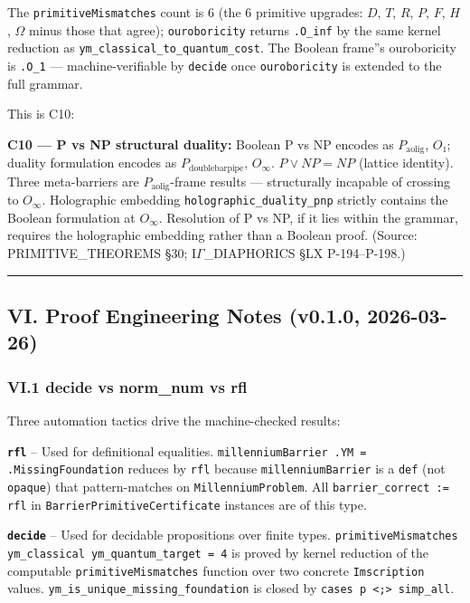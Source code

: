 \documentclass[12pt,a4paper]{article}
\newcommand{\pilcrow}{\S}
\begin{document}
The \texttt{primitiveMismatches} count is 6 (the 6 primitive upgrades: $D$, $T$, $R$, $P$, $F$, $H$, $\Omega$ minus those that agree); \texttt{ouroboricity} returns \texttt{.O\_inf} by the same kernel reduction as \texttt{ym\_classical\_to\_quantum\_cost}. The Boolean frame''s ouroboricity is \texttt{.O\_1} --- machine-verifiable by \texttt{decide} once \texttt{ouroboricity} is extended to the full grammar.

This is C10:

\textbf{C10 --- P vs NP structural duality:} Boolean P vs NP encodes as $P_{\text{aolig}}$, $O₁$; duality formulation encodes as $P_{\text{doublebarpipe}}$, $O_{\infty}$. $P \vee NP = NP$ (lattice identity). Three meta-barriers are $P_{\text{aolig}}$-frame results --- structurally incapable of crossing to $O_{\infty}$. Holographic embedding \texttt{holographic\_duality\_pnp} strictly contains the Boolean formulation at $O_{\infty}$. Resolution of P vs NP, if it lies within the grammar, requires the holographic embedding rather than a Boolean proof. (Source: PRIMITIVE\_THEOREMS \pilcrow{}30; I$\Gamma$\_DIAPHORICS \pilcrow{}LX P-194--P-198.)

\begin{center}
\rule{0.5\textwidth}{0.4pt}
\end{center}

\subsection{VI. Proof Engineering Notes (v0.1.0, 2026-03-26)}

\subsubsection{VI.1 decide vs norm\_num vs rfl}

Three automation tactics drive the machine-checked results:

\textbf{\texttt{rfl}}  --  Used for definitional equalities. \texttt{millenniumBarrier .YM = .MissingFoundation} reduces by \texttt{rfl} because \texttt{millenniumBarrier} is a \texttt{def} (not \texttt{opaque}) that pattern-matches on \texttt{MillenniumProblem}. All \texttt{barrier\_correct := rfl} in \texttt{BarrierPrimitiveCertificate} instances are of this type.

\textbf{\texttt{decide}}  --  Used for decidable propositions over finite types. \texttt{primitiveMismatches ym\_classical ym\_quantum\_target = 4} is proved by kernel reduction of the computable \texttt{primitiveMismatches} function over two concrete \texttt{Imscription} values. \texttt{ym\_is\_unique\_missing\_foundation} is closed by \texttt{cases p \textless{};\textgreater{} simp\_all}.
\end{document}
